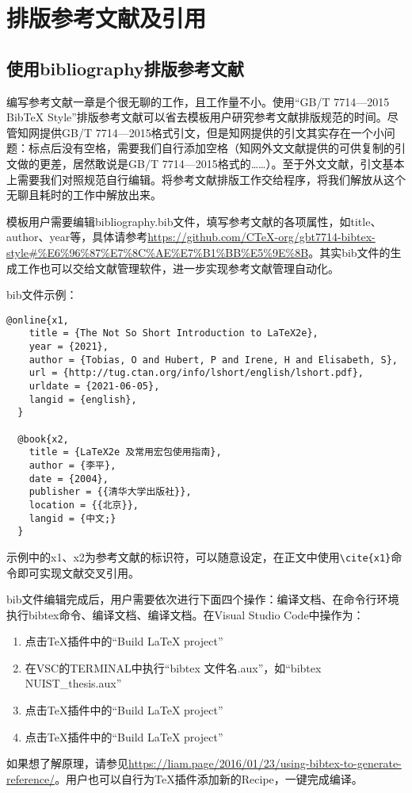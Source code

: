 \section{排版参考文献及引用}
\subsection{使用bibliography排版参考文献}
编写参考文献一章是个很无聊的工作，且工作量不小。使用“GB/T 7714—2015 BibTeX Style”排版参考文献可以省去模板用户研究参考文献排版规范的时间。尽管知网提供GB/T 7714—2015格式引文，但是知网提供的引文其实存在一个小问题：标点后没有空格，需要我们自行添加空格（知网外文文献提供的可供复制的引文做的更差，居然敢说是GB/T 7714—2015格式的……）。至于外文文献，引文基本上需要我们对照规范自行编辑。将参考文献排版工作交给程序，将我们解放从这个无聊且耗时的工作中解放出来。

模板用户需要编辑bibliography.bib文件，填写参考文献的各项属性，如title、author、year等，具体请参考\url{https://github.com/CTeX-org/gbt7714-bibtex-style#%E6%96%87%E7%8C%AE%E7%B1%BB%E5%9E%8B}。其实bib文件的生成工作也可以交给文献管理软件，进一步实现参考文献管理自动化。

bib文件示例：
{\color{green!50!black}
\begin{lstlisting}[breaklines=true,]
    @online{x1,
    title = {The Not So Short Introduction to LaTeX2e},
    year = {2021},
    author = {Tobias, O and Hubert, P and Irene, H and Elisabeth, S},
    url = {http://tug.ctan.org/info/lshort/english/lshort.pdf},
    urldate = {2021-06-05},
    langid = {english},
  }
  
  @book{x2,
    title = {LaTeX2e 及常用宏包使用指南},
    author = {李平},
    date = {2004},
    publisher = {{清华大学出版社}},
    location = {{北京}},
    langid = {中文;}
  }
\end{lstlisting}
}
示例中的x1、x2为参考文献的标识符，可以随意设定，在正文中使用\verb|\cite{x1}|命令即可实现文献交叉引用。

bib文件编辑完成后，用户需要依次进行下面四个操作：编译文档、在命令行环境执行bibtex命令、编译文档、编译文档。在Visual Studio Code中操作为：
\begin{enumerate}[1、]
    \item 点击\TeX 插件中的“Build LaTeX project”
    \item 在VSC的TERMINAL中执行“bibtex 文件名.aux”，如“bibtex NUIST\_thesis.aux”
    \item 点击\TeX 插件中的“Build LaTeX project”
    \item 点击\TeX 插件中的“Build LaTeX project”
\end{enumerate}
如果想了解原理，请参见\url{https://liam.page/2016/01/23/using-bibtex-to-generate-reference/}。用户也可以自行为\TeX 插件添加新的Recipe，一键完成编译。

